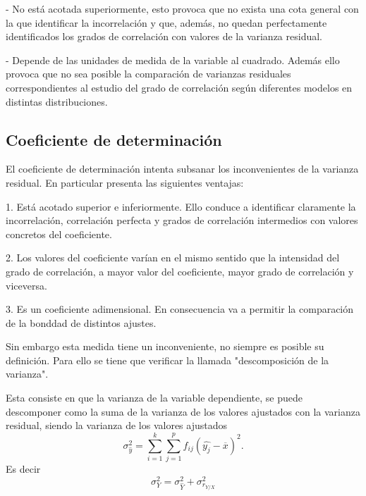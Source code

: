 \documentclass{article}
\begin{document}
- No está acotada superiormente, esto provoca que no exista una cota general con la que identificar la incorrelación y que, además, no quedan perfectamente identificados los grados de correlación con valores de la varianza residual. 

\vspace{2mm}

- Depende de las unidades de medida de la variable al cuadrado. Además ello provoca que no sea posible la comparación de varianzas residuales correspondientes al estudio del grado de correlación según diferentes modelos en distintas distribuciones.

\subsection{Coeficiente de determinación}

	El coeficiente de determinación intenta subsanar los inconvenientes de la varianza residual. En particular presenta las siguientes ventajas:
	\vspace{2mm}
	
	1. Está acotado superior e inferiormente. Ello conduce a identificar claramente la incorrelación, correlación perfecta y grados de correlación intermedios con valores concretos del coeficiente.
	
	\vspace{2mm}
	
	2. Los valores del coeficiente varían en el mismo sentido que la intensidad del grado de correlación, a mayor valor del coeficiente, mayor grado de correlación y viceversa.
	
	\vspace{2mm}
	
	3. Es un coeficiente adimensional. En consecuencia va a permitir la comparación de la bonddad de distintos ajustes.
	
	\vspace{2mm}
	
	Sin embargo esta medida tiene un inconveniente, no siempre es posible su definición. Para ello se tiene que verificar la llamada "descomposición de la varianza".
	
	\vspace{2mm}
	
	Esta consiste en que la varianza de la variable dependiente, se puede descomponer como la suma de la varianza de los valores ajustados con la varianza residual, siendo la varianza de los valores ajustados $$\sigma_{\hat{y}}^2 = \sum_{i=1}^k \sum_{j=1}^p f_{ij} (\hat{y_j} - \overline{x} )^2. $$
Es decir
	$$ \sigma_Y^2 = \sigma_{\hat{Y}}^2 + \sigma_{r_{Y/X}}^2 $$
	
\end{document}
